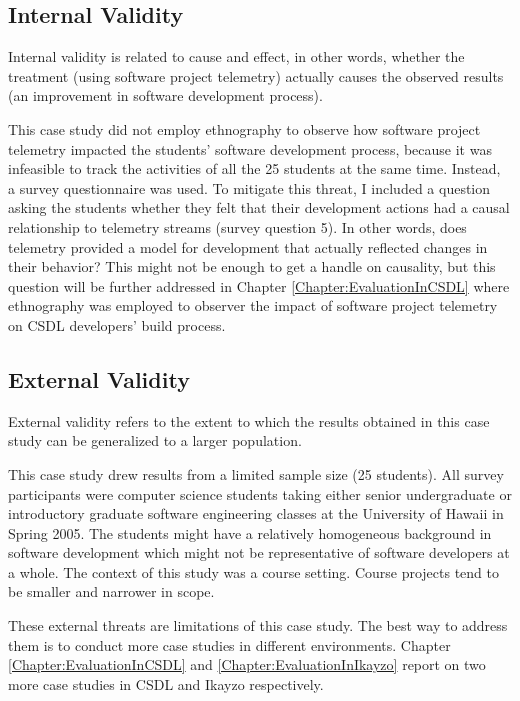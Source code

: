 
\subsection{Internal Validity}
 
Internal validity is related to cause and effect, in other words, whether the treatment (using software project telemetry) actually causes the observed results (an improvement in software development process). 

This case study did not employ ethnography to observe how software project telemetry impacted the students' software development process, because it was infeasible to track the activities of all the 25 students at the same time. Instead, a survey questionnaire was used. To mitigate this threat, I included a question asking the students whether they felt that their development actions had a causal relationship to telemetry streams (survey question 5). In other words, does telemetry provided a model for development that actually reflected changes in their behavior? This might not be enough to get a handle on causality, but this question will be further addressed in Chapter \ref{Chapter:EvaluationInCSDL} where ethnography was employed to observer the impact of software project telemetry on CSDL developers' build process.

 
 
 

\subsection{External Validity}

External validity refers to the extent to which the results obtained in this case study can be generalized to a larger population. 

This case study drew results from a limited sample size (25 students). All survey participants were computer science students taking either senior undergraduate or introductory graduate software engineering classes at the University of Hawaii in Spring 2005. The students might have a relatively homogeneous background in software development which might not be representative of software developers at a whole. The context of this study was a course setting. Course projects tend to be smaller and narrower in scope. 

These external threats are limitations of this case study. The best way to address them is to conduct more case studies in different environments. Chapter \ref{Chapter:EvaluationInCSDL} and \ref{Chapter:EvaluationInIkayzo} report on two more case studies in CSDL and Ikayzo respectively.


